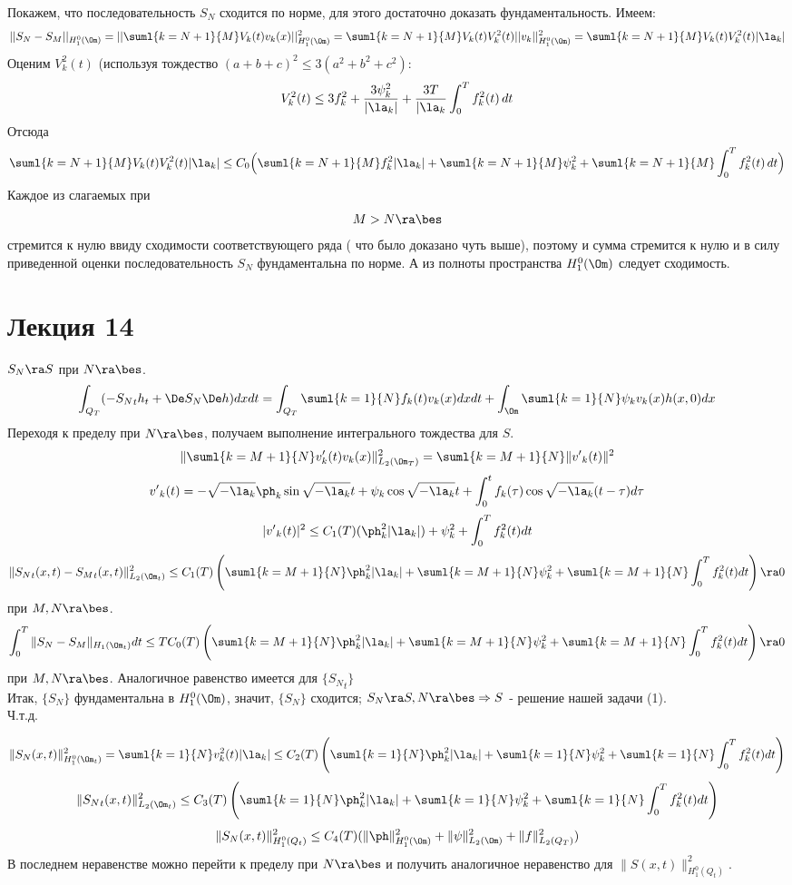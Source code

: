 \documentclass[a4paper,draft]{article}
\begin{document}
Покажем, что последовательность $S_N$ сходится по норме, для этого
достаточно доказать фундаментальность. Имеем:
$$
||S_N-S_M||_{H_1^0(\Om)}=||\suml{k=N+1}{M} V_k(t)
v_k(x)||^2_{H_1^0(\Om)} = \suml{k=N+1}{M} V_k(t)
V_k^2(t)||v_k||^2_{H_1^0(\Om)}=\suml{k=N+1}{M} V_k(t) V_k^2(t)
|\la_k|
$$
Оценим $V_k^2(t)$ (используя тождество $(a+b+c)^2\le
3(a^2+b^2+c^2)$:
$$
V_k^2(t)\le 3f_k^2+\frac{3\psi_k^2}{|\la_k|} + \frac
{3T}{|\la_k} \int_0^T f_k^2(t)\,dt
$$
Отсюда
$$
\suml{k=N+1}{M} V_k(t) V_k^2(t) |\la_k|\le C_0\Bigl(
\suml{k=N+1}{M} f_k^2|\la_k|+\suml{k=N+1}{M} \psi_k^2
+\suml{k=N+1}{M} \int_0^T f_k^2(t)\,dt \Bigr)
$$
Каждое из слагаемых при $$M>N\ra\bes$$ стремится к нулю
ввиду сходимости соответствующего ряда ( что было доказано чуть
выше), поэтому и сумма стремится к нулю и в силу приведенной
оценки последовательность $S_N$ фундаментальна по норме. А из
полноты пространства $H_1^0(\Om)$ следует сходимость.




\section{Лекция 14}
$S_N\ra S$ при $N\ra\bes$.
$$\int_{Q_T}(-{S_N}_th_t + \De S_N\De
h)dxdt=\int_{Q_T}\suml{k=1}{N} f_k(t)v_k(x)dxdt+
\int_{\Om}\suml{k=1}{N} \psi_kv_k(x)h(x,0)dx
$$
Переходя к пределу при $N\ra\bes$, получаем выполнение
интегрального тождества для $S$.
$$
\|\suml{k=M+1}{N} v'_k(t)v_k(x)\|^2_{L_2(\Om_T)}=\suml{k=M+1}{N}\|{v'}_k(t)\|^2
$$
$$
{v'}_k(t)=-\sqrt{-\la_k}\ph_k\sin\sqrt{-\la_k}t+\psi_k\cos\sqrt{-\la_k}t+
\int_0^tf_k(\tau)\cos\sqrt{-\la_k}(t-\tau)d\tau
$$
$$
|{v'}_k(t)|^2\le
C_1(T)(\ph_k^2|\la_k|)+\psi_k^2+\int_0^Tf_k^2(t)dt
$$
$$
\|{S_N}_t(x,t)-{S_M}_t(x,t)\|^2_{L_2(\Om_t)}\le
C_1(T)\left(\suml{k=M+1}{N}\ph_k^2|\la_k|+\suml{k=M+1}{N}\psi_k^2+\suml{k=M+1}{N}\int_0^Tf_k^2(t)dt\right)\ra
0
$$
при $M,N\ra\bes$.
$$
\int_0^T\|S_N-S_M\|_{H_1(\Om_t)}dt\le
TC_0(T)\left(\suml{k=M+1}{N}\ph_k^2|\la_k|+\suml{k=M+1}{N}\psi_k^2+\suml{k=M+1}{N}\int_0^Tf_k^2(t)dt\right)\ra
0
$$
при $M,N\ra\bes$. Аналогичное равенство имеется для $\{{S_N}_t\}$\\
Итак, $\{S_N\}$ фундаментальна в $H_1^0(\Om)$, значит,
$\{S_N\}$ сходится; $S_N\ra S, N\ra\bes \Rightarrow S$ - решение
нашей задачи (1).\\
Ч.т.д.

$$
\|S_N(x,t)\|^2_{H_1^0(\Om_t)}=\suml{k=1}{N} v_k^2(t)|\la_k|\le
C_2(T)\left(\suml{k=1}{N}\ph_k^2|\la_k|+\suml{k=1}{N}\psi_k^2+\suml{k=1}{N}\int_0^Tf_k^2(t)dt\right)
$$
$$
\|{S_N}_t(x,t)\|^2_{L_2(\Om_t)}\le
C_3(T)\left(\suml{k=1}{N}\ph_k^2|\la_k|+\suml{k=1}{N}\psi_k^2+\suml{k=1}{N}\int_0^Tf_k^2(t)dt\right)
$$
$$
\|S_N(x,t)\|^2_{H_1^0(Q_t)}\le
C_4(T)(\|\ph\|^2_{H_1^0(\Om)}+\|\psi\|^2_{L_2(\Om)}+\|f\|^2_{L_2(Q_T)})
$$
В последнем неравенстве можно перейти к пределу при $N\ra\bes$ и
получить аналогичное неравенство для $\|S(x,t)\|^2_{H_1^0(Q_t)}$.
\end{document}
